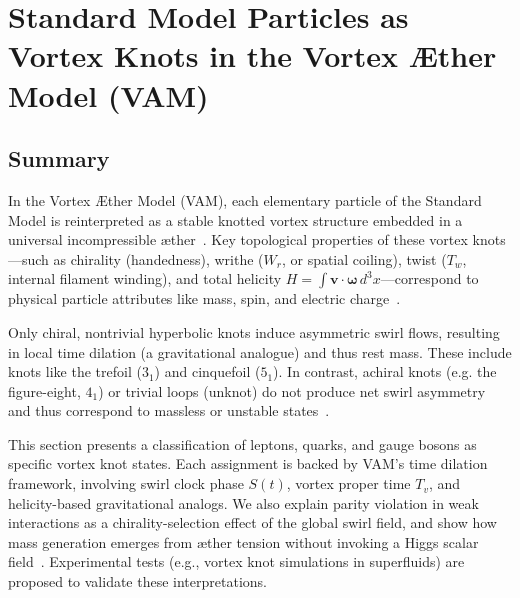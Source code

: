 \section*{Standard Model Particles as Vortex Knots in the Vortex Æther Model (VAM)}

\subsection*{Summary}

In the Vortex Æther Model (VAM), each elementary particle of the Standard Model is reinterpreted as a stable knotted vortex structure embedded in a universal incompressible æther~\cite{iskandarani2025vam5}. Key topological properties of these vortex knots—such as chirality (handedness), writhe ($W_r$, or spatial coiling), twist ($T_w$, internal filament winding), and total helicity $H = \int \mathbf{v} \cdot \boldsymbol{\omega} \, d^3x$—correspond to physical particle attributes like mass, spin, and electric charge~\cite{iskandarani2025vam5}.

Only chiral, nontrivial hyperbolic knots induce asymmetric swirl flows, resulting in local time dilation (a gravitational analogue) and thus rest mass. These include knots like the trefoil ($3_1$) and cinquefoil ($5_1$). In contrast, achiral knots (e.g. the figure-eight, $4_1$) or trivial loops (unknot) do not produce net swirl asymmetry and thus correspond to massless or unstable states~\cite{iskandarani2025vam5}.

This section presents a classification of leptons, quarks, and gauge bosons as specific vortex knot states. Each assignment is backed by VAM’s time dilation framework, involving swirl clock phase $S(t)$, vortex proper time $T_v$, and helicity-based gravitational analogs. We also explain parity violation in weak interactions as a chirality-selection effect of the global swirl field, and show how mass generation emerges from æther tension without invoking a Higgs scalar field~\cite{iskandarani2025vam5}. Experimental tests (e.g., vortex knot simulations in superfluids) are proposed to validate these interpretations.

